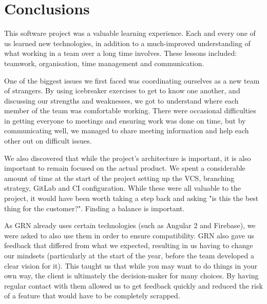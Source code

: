 \documentclass{l3proj}
\begin{document}
\section{Conclusions} %
\label{sec:conclusion}


This software project was a valuable learning experience. Each and every one of
 us learned new technologies, in addition to a much-improved understanding
 of what working in a team over a long time involves. These lessons
 included: teamwork, organisation, time management and communication.

One of the biggest issues we first faced was coordinating ourselves as a
 new team of strangers. By using icebreaker exercises to get to know
 one another, and discussing our strengths and weaknesses, we got to
 understand where each member of the team was comfortable working. There
 were occasional difficulties in getting everyone to meetings and ensuring
 work was done on time, but by communicating well, we managed to share
 meeting information and help each other out on difficult issues.

We also discovered that while the project's architecture is important,
 it is also important to remain focused on the actual product. We
 spent a considerable amount of time at the start of the project setting
 up the VCS, branching strategy, GitLab and CI configuration. While these
 were all valuable to the project, it would have been worth taking a step
 back and asking "is this the best thing for the customer?". Finding a balance
 is important.

As GRN already uses certain technologies (such as Angular 2 and Firebase),
 we were asked to also use them in order to ensure compatibility. GRN also
 gave us feedback that differed from what we expected, resulting in us
 having to change our mindsets (particularly at the start of the year,
 before the team developed a clear vision for it). This taught us that
 while you may want to do things in your own way, the client is ultimately
 the decision-maker for many choices. By having regular contact with them
 allowed us to get feedback quickly and reduced the risk of a feature that
 would have to be completely scrapped.
\end{document}
